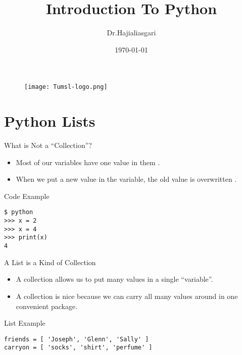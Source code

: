 \documentclass[serif, aspectratio=169]{beamer}
\author{Dr.Hajialiasgari}
\title{Introduction To Python}
\institute{
    Tehran University \\
    Of\\
    Medical Science
}
\date{\small \today}
\begin{document}
\begin{frame}
    \titlepage
    \vspace*{-0.6cm}
    \begin{figure}[htpb]
        \begin{center}
            \texttt{[image: Tumsl-logo.png]}
        \end{center}
    \end{figure}
\end{frame}

\begin{frame}    
\tableofcontents[sectionstyle=show, subsectionstyle=show/shaded/hide, subsubsectionstyle=show/shaded/hide]
\end{frame}

\section{Python Lists}

\begin{frame}{What is Not a “Collection”?}
    \begin{itemize}
        \item Most of our variables have one value in them .
        \item When we put a new value in the variable, the old value is overwritten .
    \end{itemize}
\end{frame}

\begin{frame}[fragile]{Code Example}
    \begin{lstlisting}
$ python
>>> x = 2
>>> x = 4
>>> print(x)
4
    \end{lstlisting}
\end{frame}

\begin{frame}{A List is a Kind of Collection}
    \begin{itemize}
        \item A collection allows us to put many values in a single “variable”.
        \item A collection is nice because we can carry all many values around in one convenient package.
    \end{itemize}
\end{frame}

\begin{frame}[fragile]{List Example}
    \begin{lstlisting}
friends = [ 'Joseph', 'Glenn', 'Sally' ]
carryon = [ 'socks', 'shirt', 'perfume' ]

    \end{lstlisting}
\end{frame}
\end{document}
